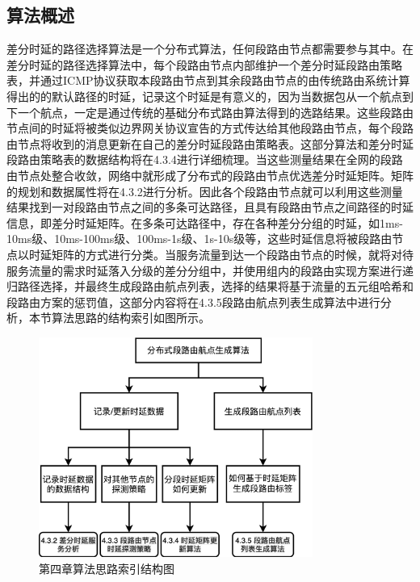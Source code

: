 \subsection{算法概述}

差分时延的路径选择算法是一个分布式算法，任何段路由节点都需要参与其中。在差分时延的路径选择算法中，每个段路由节点内部维护一个差分时延段路由策略表，并通过ICMP协议获取本段路由节点到其余段路由节点的由传统路由系统计算得出的的默认路径的时延，记录这个时延是有意义的，因为当数据包从一个航点到下一个航点，一定是通过传统的基础分布式路由算法得到的选路结果。这些段路由节点间的时延将被类似边界网关协议宣告的方式传达给其他段路由节点，每个段路由节点将收到的消息更新在自己的差分时延段路由策略表。这部分算法和差分时延段路由策略表的数据结构将在4.3.4进行详细梳理。当这些测量结果在全网的段路由节点处整合收敛，网络中就形成了分布式的段路由节点优选差分时延矩阵。矩阵的规划和数据属性将在4.3.2进行分析。因此各个段路由节点就可以利用这些测量结果找到一对段路由节点之间的多条可达路径，且具有段路由节点之间路径的时延信息，即差分时延矩阵。在多条可达路径中，存在各种差分分组的时延，如1ms-10ms级、10ms-100ms级、100ms-1s级、1s-10s级等，这些时延信息将被段路由节点以时延矩阵的方式进行分类。当服务流量到达一个段路由节点的时候，就将对待服务流量的需求时延落入分级的差分分组中，并使用组内的段路由实现方案进行递归路径选择，并最终生成段路由航点列表，选择的结果将基于流量的五元组哈希和段路由方案的惩罚值，这部分内容将在4.3.5段路由航点列表生成算法中进行分析，本节算法思路的结构索引如图所示。

\begin{figure}[htbp]
\setlength{\abovecaptionskip}{15pt plus 3pt minus 2pt}
\centerline{\includegraphics[width=0.8\textwidth]{./figures/ch4-ark.png}}
\caption{第四章算法思路索引结构图}
\label{fig-ch4-ark}
\end{figure}

